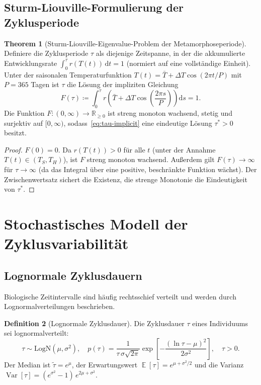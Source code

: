 ﻿\documentclass[12pt, a4paper]{article}
\theoremstyle{definition}
\newtheorem{theorem}{Theorem}[section]
\newtheorem{definition}[theorem]{Definition}
\DeclareMathOperator{\E}{\mathbb{E}}
\DeclareMathOperator{\Var}{Var}
\newcommand{\R}{\mathbb{R}}
\newcommand{\dd}{\mathrm{d}}
\begin{document}
\subsection{Sturm-Liouville-Formulierung der Zyklusperiode}

\begin{theorem}[Sturm-Liouville-Eigenvalue-Problem der Metamorphoseperiode]\label{thm:sturm-liouville}
Definiere die Zyklusperiode $\tau$ als diejenige Zeitspanne, in der die
akkumulierte Entwicklungsrate $\int_0^\tau r(T(t))\,\dd t = 1$ (normiert auf eine
vollständige Einheit). Unter der saisonalen Temperaturfunktion
$T(t) = \bar{T} + \Delta T \cos(2\pi t / P)$ mit $P = 365$ Tagen ist $\tau$ die
Lösung der impliziten Gleichung
\begin{equation}\label{eq:tau-implicit}
  F(\tau) \coloneqq \int_0^\tau r\!\left(\bar{T} + \Delta T \cos\!\left(\frac{2\pi s}{P}\right)\right)\dd s = 1.
\end{equation}
Die Funktion $F: (0, \infty) \to \R_{\geq 0}$ ist streng monoton wachsend,
stetig und surjektiv auf $[0, \infty)$, sodass~\eqref{eq:tau-implicit} eine
eindeutige Lösung $\tau^* > 0$ besitzt.
\end{theorem}

\begin{proof}
$F(0) = 0$. Da $r(T(t)) > 0$ für alle $t$ (unter der Annahme $T(t) \in (T_S, T_H)$),
ist $F$ streng monoton wachsend. Außerdem gilt $F(\tau) \to \infty$ für
$\tau \to \infty$ (da das Integral über eine positive, beschränkte Funktion
wächst). Der Zwischenwertsatz sichert die Existenz, die strenge Monotonie
die Eindeutigkeit von $\tau^*$. \hfill
\end{proof}

\section{Stochastisches Modell der Zyklusvariabilität}

\subsection{Lognormale Zyklusdauern}

Biologische Zeitintervalle sind häufig rechtsschief verteilt und werden durch
Lognormalverteilungen beschrieben.

\begin{definition}[Lognormale Zyklusdauer]\label{def:lognormal}
Die Zyklusdauer $\tau$ eines Individuums sei lognormalverteilt:
\[
  \tau \sim \mathrm{LogN}(\mu, \sigma^2), \quad
  p(\tau) = \frac{1}{\tau\,\sigma\sqrt{2\pi}}\exp\!\left[-\frac{(\ln\tau - \mu)^2}{2\sigma^2}\right],
  \quad \tau > 0.
\]
Der Median ist $\tilde{\tau} = e^\mu$, der Erwartungswert
$\E[\tau] = e^{\mu + \sigma^2/2}$ und die Varianz
$\Var[\tau] = (e^{\sigma^2} - 1)\,e^{2\mu+\sigma^2}$.
\end{definition}
\end{document}
